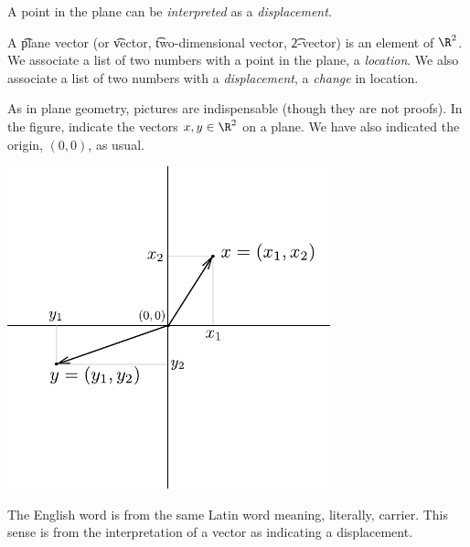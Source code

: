 
A point in the plane can be \textit{interpreted} as a \textit{displacement}.

A \t{plane vector} (or \t{vector}, \t{two-dimensional vector}, \t{2-vector}) is an element of $\R ^2$.
We associate a list of two numbers with a point in the plane, a \textit{location}.
We also associate a list of two numbers with a \textit{displacement}, a \textit{change} in location.

As in plane geometry, pictures are indispensable (though they are not proofs).
In the figure, indicate the vectors $x, y \in \R ^2$ on a plane.
We have also indicated the origin, $(0, 0)$, as usual.
\begin{center}
\includegraphics[width=0.7\textwidth]{graphics/vector_components}
\end{center}

The English word  is from the same Latin word  meaning, literally, carrier.
This sense is from the interpretation of a vector as indicating a displacement.
